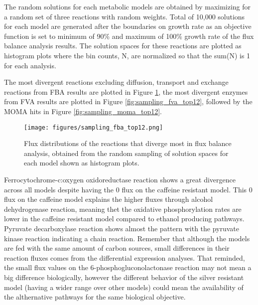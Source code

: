 The random solutions for each metabolic models are obtained by maximizing for a random set of three reactions with random weights. Total of 10,000 solutions for each model are generated after the boundaries on growth rate as an objective function is set to minimum of 90\% and maximum of 100\% growth rate of the flux balance analysis results. The solution spaces for these reactions are plotted as histogram plots where the bin counts, N, are normalized so that the sum(N) is 1 for each analysis.

The most divergent reactions excluding diffusion, transport and exchange reactions from FBA results are plotted in Figure \ref{fig:sampling_fba_top12}, the most divergent enzymes from FVA results are plotted in Figure \ref{fig:sampling_fva_top12}, followed by the MOMA hits in Figure \ref{fig:sampling_moma_top12}.

\begin{figure}[H]
  \begin{center}
  \texttt{[image: figures/sampling\_fba\_top12.png]}
  \caption[Flux distributions of the reactions that diverge most in flux balance analysis, obtained from the random sampling of solution spaces for each model shown as histogram plots]{Flux distributions of the reactions that diverge most in flux balance analysis, obtained from the random sampling of solution spaces for each model shown as histogram plots.}
  \label{fig:sampling_fba_top12}
  \end{center}
\end{figure}

Ferrocytochrome-c:oxygen oxidoreductase reaction shows a great divergence across all models despite having the 0 flux on the caffeine resistant model. This 0 flux on the caffeine model explains the higher fluxes through alcohol dehydrogenase reaction, meaning thet the oxidative phosphorylation rates are lower in the caffeine resistant model compared to ethanol producing pathways. Pyruvate decarboxylase reaction shows almost the pattern with the pyruvate kinase reaction indicating a chain reaction. Remember that although the models are fed with the same amount of carbon sources, small differences in their reaction fluxes comes from the differential expression analyses. That reminded, the small flux values on the 6-phosphogluconolactonase reaction may not mean a big difference biologically, however the different behavior of the silver resistant model (having a wider range over other models) could mean the availability of the althernative pathways for the same biological objective.


